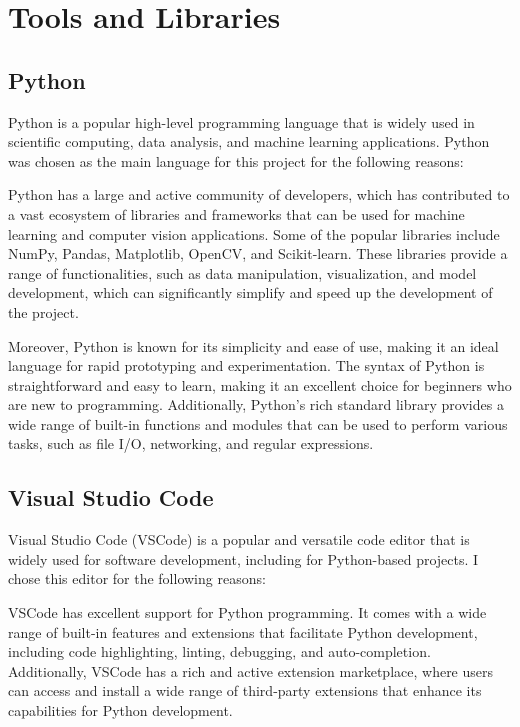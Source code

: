 \documentclass[final,rdr32.tex]{subfiles}
\begin{document}
\section{Tools and Libraries}

\subsection*{Python}

Python is a popular high-level programming language that is widely used in scientific computing, data analysis, and machine learning applications. Python was chosen as the main language for this project for the following reasons:

Python has a large and active community of developers, which has contributed to a vast ecosystem of libraries and frameworks that can be used for machine learning and computer vision applications. Some of the popular libraries include NumPy, Pandas, Matplotlib, OpenCV, and Scikit-learn. These libraries provide a range of functionalities, such as data manipulation, visualization, and model development, which can significantly simplify and speed up the development of the project.

Moreover, Python is known for its simplicity and ease of use, making it an ideal language for rapid prototyping and experimentation. The syntax of Python is straightforward and easy to learn, making it an excellent choice for beginners who are new to programming. Additionally, Python's rich standard library provides a wide range of built-in functions and modules that can be used to perform various tasks, such as file I/O, networking, and regular expressions.


\subsection{Visual Studio Code}

Visual Studio Code (VSCode) is a popular and versatile code editor that is widely used for software development, including for Python-based projects. I chose this editor for the following reasons:

VSCode has excellent support for Python programming. It comes with a wide range of built-in features and extensions that facilitate Python development, including code highlighting, linting, debugging, and auto-completion. Additionally, VSCode has a rich and active extension marketplace, where users can access and install a wide range of third-party extensions that enhance its capabilities for Python development.
\end{document}
